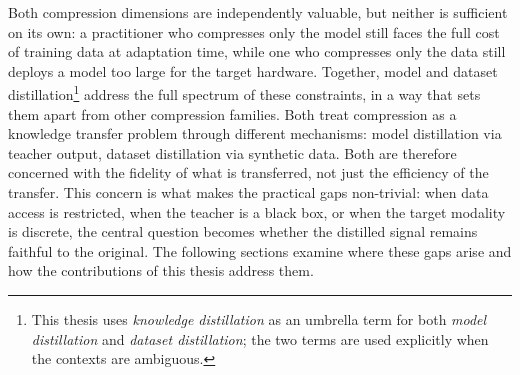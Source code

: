 \documentclass[12pt, a4paper, twoside]{book}
\numberwithin{equation}{chapter}
\theoremstyle{plain}
\theoremstyle{definition}
\theoremstyle{remark}
\newenvironment{foldable}{}{}
\begin{document}
\begin{foldable}
  Both compression dimensions are independently valuable, but neither is sufficient on its own: a practitioner who compresses only the model still faces the full cost of training data at adaptation time, while one who compresses only the data still deploys a model too large for the target hardware.
  Together, model and dataset distillation\footnote{This thesis uses \textit{knowledge distillation} as an umbrella term for both \textit{model distillation} and \textit{dataset distillation}; the two terms are used explicitly when the contexts are ambiguous.} address the full spectrum of these constraints, in a way that sets them apart from other compression families.
  Both treat compression as a knowledge transfer problem through different mechanisms: model distillation via teacher output, dataset distillation via synthetic data.
  Both are therefore concerned with the fidelity of what is transferred, not just the efficiency of the transfer.
  This concern is what makes the practical gaps non-trivial: when data access is restricted, when the teacher is a black box, or when the target modality is discrete, the central question becomes whether the distilled signal remains faithful to the original.
  The following sections examine where these gaps arise and how the contributions of this thesis address them.
\end{foldable}
\end{document}
